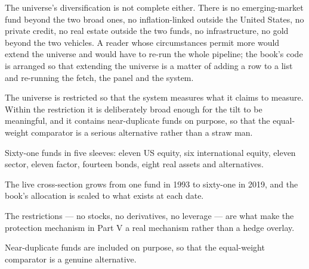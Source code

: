The universe's diversification is not complete either. There is no
emerging-market fund beyond the two broad ones, no inflation-linked
outside the United States, no private credit, no real estate outside the
two funds, no infrastructure, no gold beyond the two vehicles. A reader
whose circumstances permit more would extend the universe and would have
to re-run the whole pipeline; the book's code is arranged so that
extending the universe is a matter of adding a row to a list and re-running
the fetch, the panel and the system.

\begin{takeaway}
The universe is restricted so that the system measures what it claims to
measure. Within the restriction it is deliberately broad enough for the
tilt to be meaningful, and it contains near-duplicate funds on purpose, so
that the equal-weight comparator is a serious alternative rather than a
straw man.
\end{takeaway}

\begin{keytakeaways}
\item Sixty-one funds in five sleeves: eleven US equity, six international
equity, eleven sector, eleven factor, fourteen bonds, eight real assets
and alternatives.
\item The live cross-section grows from one fund in 1993 to sixty-one in
2019, and the book's allocation is scaled to what exists at each date.
\item The restrictions --- no stocks, no derivatives, no leverage --- are
what make the protection mechanism in Part V a real mechanism rather than
a hedge overlay.
\item Near-duplicate funds are included on purpose, so that the equal-weight
comparator is a genuine alternative.
\end{keytakeaways}
